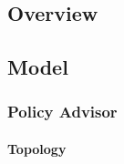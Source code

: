 \documentclass{article}
\begin{document}
	    \subsection{Overview}




	    \subsection{Model}

            \subsubsection{Policy Advisor}

                \paragraph{Topology}


\end{document}
